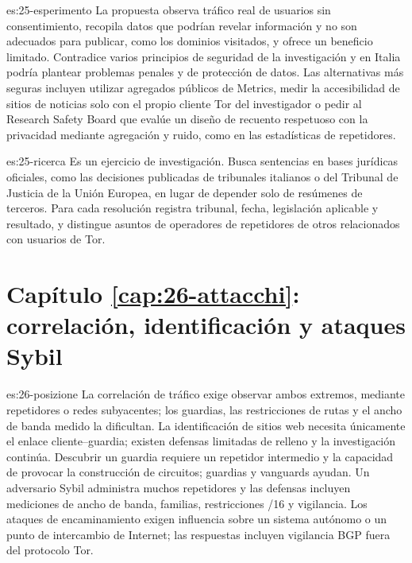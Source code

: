 \begin{soluzione}{es:25-esperimento}
La propuesta observa tráfico real de usuarios sin consentimiento, recopila datos que podrían revelar información y no son adecuados para publicar, como los dominios visitados, y ofrece un beneficio limitado. Contradice varios principios de seguridad de la investigación y en Italia podría plantear problemas penales y de protección de datos. Las alternativas más seguras incluyen utilizar agregados públicos de Metrics, medir la accesibilidad de sitios de noticias solo con el propio cliente Tor del investigador o pedir al Research Safety Board que evalúe un diseño de recuento respetuoso con la privacidad mediante agregación y ruido, como en las estadísticas de repetidores.
\end{soluzione}

\begin{soluzione}{es:25-ricerca}
Es un ejercicio de investigación. Busca sentencias en bases jurídicas oficiales, como las decisiones publicadas de tribunales italianos o del Tribunal de Justicia de la Unión Europea, en lugar de depender solo de resúmenes de terceros. Para cada resolución registra tribunal, fecha, legislación aplicable y resultado, y distingue asuntos de operadores de repetidores de otros relacionados con usuarios de Tor.
\end{soluzione}

\section*{Capítulo \ref{cap:26-attacchi}: correlación, identificación y ataques Sybil}

\begin{soluzione}{es:26-posizione}
La correlación de tráfico exige observar ambos extremos, mediante repetidores o redes subyacentes; los guardias, las restricciones de rutas y el ancho de banda medido la dificultan. La identificación de sitios web necesita únicamente el enlace cliente--guardia; existen defensas limitadas de relleno y la investigación continúa. Descubrir un guardia requiere un repetidor intermedio y la capacidad de provocar la construcción de circuitos; guardias y vanguards ayudan. Un adversario Sybil administra muchos repetidores y las defensas incluyen mediciones de ancho de banda, familias, restricciones /16 y vigilancia. Los ataques de encaminamiento exigen influencia sobre un sistema autónomo o un punto de intercambio de Internet; las respuestas incluyen vigilancia BGP fuera del protocolo Tor.
\end{soluzione}

